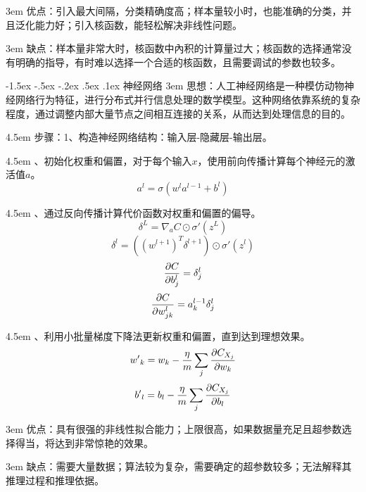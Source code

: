 \documentclass[a4paper, 11pt]{article}
\makeatletter
\newcommand{\sihao}{\fontsize{14pt}{\baselineskip}\selectfont}
\renewcommand\section{\@startsection{section}{1}{\z@}%
{-1.5ex \@plus -.5ex \@minus -.2ex}%
{.5ex \@plus .1ex}%
{\normalfont\sihao\CJKfamily{hei}}}
\makeatother
\begin{document}
\begin{CJK*}{GBK}{song}
\begin{table}[htbp]
\end{table}


\hangindent 3em
优点：引入最大间隔，分类精确度高；样本量较小时，也能准确的分类，并且泛化能力好；引入核函数，能轻松解决非线性问题。

\hangindent 3em
缺点：样本量非常大时，核函数中內积的计算量过大；核函数的选择通常没有明确的指导，有时难以选择一个合适的核函数，且需要调试的参数也较多。


\section{神经网络}
\hangindent 3em
思想：人工神经网络是一种模仿动物神经网络行为特征，进行分布式并行信息处理的数学模型。这种网络依靠系统的复杂程度，通过调整内部大量节点之间相互连接的关系，从而达到处理信息的目的。

\hangindent 4.5em
步骤：1、构造神经网络结构：输入层-隐藏层-输出层。

\hangindent 4.5em
\quad\quad{}、初始化权重和偏置，对于每个输入$x$，使用前向传播计算每个神经元的激活值$a$。
$${a^l} = \sigma ({w^l}{a^{l - 1}} + {b^l})$$

\hangindent 4.5em
\quad\quad{}、通过反向传播计算代价函数对权重和偏置的偏导。
$${\delta ^L} = {\nabla _a}C \odot \sigma '({z^L})$$
$${\delta ^l} = ({({w^{l + 1}})^T}{\delta ^{l + 1}}) \odot \sigma '({z^l})$$
$${{\partial C} \over {\partial b_j^l}} = \delta _j^l$$
$${{\partial C} \over {\partial w_{jk}^l}} = a_k^{l - 1}\delta _j^l$$

\hangindent 4.5em
\quad\quad{}、利用小批量梯度下降法更新权重和偏置，直到达到理想效果。
$${{w'}_k} = {w_k} - {\eta  \over m}\sum\limits_j {{{\partial {C_{{X_j}}}} \over {\partial {w_k}}}} $$
$${{b'}_l} = {b_l} - {\eta  \over m}\sum\limits_j {{{\partial {C_{{X_j}}}} \over {\partial {b_l}}}} $$

\hangindent 3em
优点：具有很强的非线性拟合能力；上限很高，如果数据量充足且超参数选择得当，将达到非常惊艳的效果。

\hangindent 3em
缺点：需要大量数据；算法较为复杂，需要确定的超参数较多；无法解释其推理过程和推理依据。

\end{CJK*}
\end{document}
